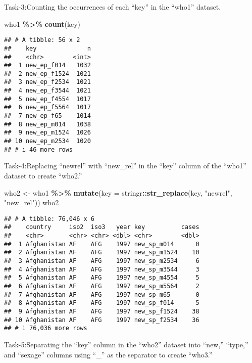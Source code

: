 \documentclass[
]{article}
\newenvironment{Shaded}{\begin{snugshade}}{\end{snugshade}}
\newcommand{\AttributeTok}[1]{\textcolor[rgb]{0.13,0.29,0.53}{#1}}
\newcommand{\FunctionTok}[1]{\textcolor[rgb]{0.13,0.29,0.53}{\textbf{#1}}}
\newcommand{\NormalTok}[1]{#1}
\newcommand{\OtherTok}[1]{\textcolor[rgb]{0.56,0.35,0.01}{#1}}
\newcommand{\SpecialCharTok}[1]{\textcolor[rgb]{0.81,0.36,0.00}{\textbf{#1}}}
\newcommand{\StringTok}[1]{\textcolor[rgb]{0.31,0.60,0.02}{#1}}
\begin{document}
Task-3:Counting the occurrences of each ``key'' in the ``who1'' dataset.

\begin{Shaded}
\begin{Highlighting}[]
\NormalTok{  who1 }\SpecialCharTok{\%\textgreater{}\%} 
    \FunctionTok{count}\NormalTok{(key)}
\end{Highlighting}
\end{Shaded}

\begin{verbatim}
## # A tibble: 56 x 2
##    key              n
##    <chr>        <int>
##  1 new_ep_f014   1032
##  2 new_ep_f1524  1021
##  3 new_ep_f2534  1021
##  4 new_ep_f3544  1021
##  5 new_ep_f4554  1017
##  6 new_ep_f5564  1017
##  7 new_ep_f65    1014
##  8 new_ep_m014   1038
##  9 new_ep_m1524  1026
## 10 new_ep_m2534  1020
## # i 46 more rows
\end{verbatim}

Task-4:Replacing ``newrel'' with ``new\_rel'' in the ``key'' column of
the ``who1'' dataset to create ``who2.''

\begin{Shaded}
\begin{Highlighting}[]
\NormalTok{who2 }\OtherTok{\textless{}{-}}\NormalTok{ who1 }\SpecialCharTok{\%\textgreater{}\%} 
  \FunctionTok{mutate}\NormalTok{(}\AttributeTok{key =}\NormalTok{ stringr}\SpecialCharTok{::}\FunctionTok{str\_replace}\NormalTok{(key, }\StringTok{"newrel"}\NormalTok{, }\StringTok{"new\_rel"}\NormalTok{))}
\NormalTok{who2}
\end{Highlighting}
\end{Shaded}

\begin{verbatim}
## # A tibble: 76,046 x 6
##    country     iso2  iso3   year key          cases
##    <chr>       <chr> <chr> <dbl> <chr>        <dbl>
##  1 Afghanistan AF    AFG    1997 new_sp_m014      0
##  2 Afghanistan AF    AFG    1997 new_sp_m1524    10
##  3 Afghanistan AF    AFG    1997 new_sp_m2534     6
##  4 Afghanistan AF    AFG    1997 new_sp_m3544     3
##  5 Afghanistan AF    AFG    1997 new_sp_m4554     5
##  6 Afghanistan AF    AFG    1997 new_sp_m5564     2
##  7 Afghanistan AF    AFG    1997 new_sp_m65       0
##  8 Afghanistan AF    AFG    1997 new_sp_f014      5
##  9 Afghanistan AF    AFG    1997 new_sp_f1524    38
## 10 Afghanistan AF    AFG    1997 new_sp_f2534    36
## # i 76,036 more rows
\end{verbatim}

Task-5:Separating the ``key'' column in the ``who2'' dataset into
``new,'' ``type,'' and ``sexage'' columns using ``\_'' as the separator
to create ``who3.''
\end{document}
